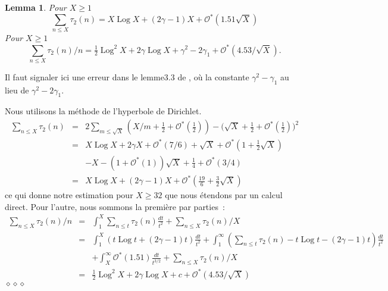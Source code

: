\documentclass[12pt,a4paper,twoside]{article}
\newtheorem{lem}{Lemma}[section]
\newenvironment{dem}{\medbreak\noindent{\sc Preuve : }}%
{\hfill $\diamond\diamond\diamond$\par\medbreak}
\def\Ocal{\mathcal{O}}
\DeclareMathOperator{\Log}{Log}
\begin{document}
\begin{lem}
  Pour $X\ge1$
  \begin{equation*}
    \sum_{n\le X}\tau_2(n)=X\Log X+(2\gamma-1) X+\Ocal^*(1.51\sqrt{X})
  \end{equation*}
  Pour $X\ge1$
  \begin{equation*}
    \sum_{n\le X}\tau_2(n)/n=\tfrac12\Log^2 X+2\gamma \Log X+
    \gamma^2-2\gamma_1+\Ocal^*(4.53/\sqrt{X}).
  \end{equation*}
\end{lem}

Il faut signaler ici une erreur dans le lemme3.3 de \cite{Ramare*95}, o\`u la
constante $\gamma^2-\gamma_1$ au lieu de $\gamma^2-2\gamma_1$.

\begin{dem}
  Nous utilisons la m\'ethode de l'hyperbole de Dirichlet.
  \begin{eqnarray*}
    \sum_{n\le X}\tau_2(n)
    &=&2\sum_{m\le \sqrt{X}}(X/m+\tfrac12+\Ocal^*(\tfrac12))
    -\bigl(\sqrt{X}+\tfrac12+\Ocal^*(\tfrac12)\bigr)^2
    \\&=&
    X\Log X+2\gamma X+\Ocal^*(7/6)+\sqrt{X}+\Ocal^*(1+\tfrac12\sqrt{X})
    \\&&-X-(1+\Ocal^*(1))\sqrt{X}+\tfrac14+\Ocal^*(3/4)
    \\&=&
    X\Log X+(2\gamma-1) X+\Ocal^*(\tfrac{19}{6}+\tfrac32\sqrt{X})
  \end{eqnarray*}
  ce qui donne notre estimation pour $X\ge32$ que nous \'etendons par un
  calcul direct. Pour l'autre, nous sommons la premi\`ere par parties~:
  \begin{eqnarray*}
    \sum_{n\le X}\tau_2(n)/n
    &=&\int_1^X\sum_{n\le t}\tau_2(n)\frac{dt}{t^2}+{\sum_{n\le X}\tau_2(n)}/{X}
    \\&=&\int_1^X(t\Log t+(2\gamma-1)t)\frac{dt}{t^2}
    +\int_1^\infty(\sum_{n\le t}\tau_2(n)- t\Log t-(2\gamma-1)t)\frac{dt}{t^2}
    \\&&+\int_X^\infty\Ocal^*(1.51)\frac{dt}{t^{3/2}}
    +{\sum_{n\le X}\tau_2(n)}/{X}
    \\&=&\tfrac12\Log^2X+2\gamma\Log X
    +c+
    \Ocal^*(4.53/\sqrt{X})
  \end{eqnarray*}
\end{dem}
\end{document}
